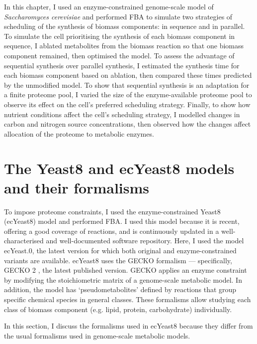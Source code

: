 In this chapter, I used an enzyme-constrained genome-scale model of \textit{Saccharomyces cerevisiae} and performed FBA to simulate two strategies of scheduling of the synthesis of biomass components: in sequence and in parallel.
To simulate the cell prioritising the synthesis of each biomass component in sequence, I ablated metabolites from the biomass reaction so that one biomass component remained, then optimised the model.
To assess the advantage of sequential synthesis over parallel synthesis, I estimated the synthesis time for each biomass component based on ablation, then compared these times predicted by the unmodified model.
To show that sequential synthesis is an adaptation for a finite proteome pool, I varied the size of the enzyme-available proteome pool to observe its effect on the cell's preferred scheduling strategy.
Finally, to show how nutrient conditions affect the cell's scheduling strategy, I modelled changes in carbon and nitrogen source concentrations, then observed how the changes affect allocation of the proteome to metabolic enzymes.


\section{The Yeast8 and ecYeast8 models and their formalisms}
\label{sec:model-yeast8}

To impose proteome constraints, I used the enzyme-constrained Yeast8 (ecYeast8) model \parencite{luConsensusCerevisiaeMetabolic2019} and performed FBA.
I used this model because it is recent, offering a good coverage of reactions, and is continuously updated in a well-characterised and well-documented software repository.
Here, I used the model ec\-Yeast.0, the latest version for which both original and enzyme-constrained variants are available.
ecYeast8 uses the GECKO formalism \parencite{sanchezImprovingPhenotypePredictions2017} --- specifically, GECKO 2 \parencite{domenzainReconstructionCatalogueGenomescale2022}, the latest published version.
GECKO applies an enzyme constraint by modifying the stoichiometric matrix of a genome-scale metabolic model.
In addition, the model has `pseudometabolites' defined by reactions that group specific chemical species in general classes.
These formalisms allow studying each class of biomass component (e.g. lipid, protein, carbohydrate) individually.

In this section, I discuss the formalisms used in ecYeast8 because they differ from the usual formalisms used in genome-scale metabolic models.

